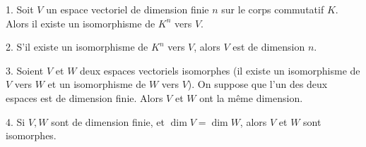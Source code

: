 \documentclass{book}
\begin{document}
\begin{theorem}

1. Soit $V$ un espace vectoriel de dimension finie $n$ sur le corps commutatif $K$. \\
Alors il existe un isomorphisme de $K^n$ vers $V$.
\medskip

2. S'il existe un isomorphisme de $K^n$ vers $V$, alors $V$ est de dimension $n$.

\medskip


3. Soient $V$ et $W$ deux espaces vectoriels isomorphes (il existe un isomorphisme de $V$ vers $W$ et un isomorphisme de $W$ vers $V$). On suppose que l'un des deux espaces est de dimension finie. Alors $V$ et $W$ ont la m\^eme dimension.

\medskip

4. Si $V,W$ sont de dimension finie, et $\dim V = \dim W$, alors $V$ et $W$ sont isomorphes.

\end{theorem}


\bigskip
\end{document}
